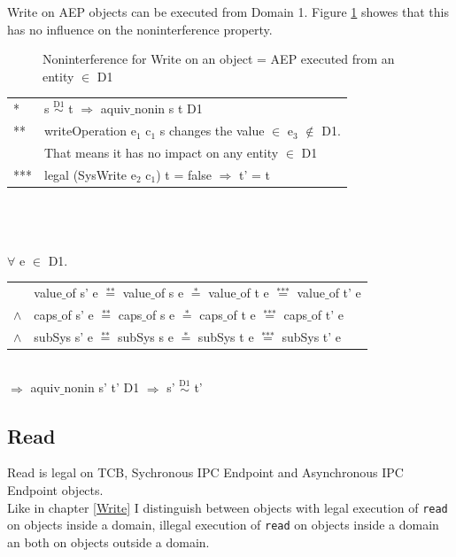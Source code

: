 \documentclass[pdftex,11pt,a4paper,twoside]{article}
\begin{document}
Write on AEP objects can be executed from Domain 1. Figure \ref{fig:WriteOut2} showes that this has no influence on the noninterference property.
\begin{flushleft}
\begin{figure}[H]
\caption{Noninterference for Write on an object = AEP executed from an entity $\in$ D1}
\label{fig:WriteOut2}
\end{figure}
\end{flushleft}
\begin{tabular}{ll}
* & s $\overset{\text{D1}}{\sim}$ t $\Rightarrow$ aquiv$\_$nonin s t D1	\\ 
** & writeOperation e$_1$ c$_1$ s changes the value $\in$ e$_3$ $\notin$ D1. \\
& That means it has no impact on any entity $\in$ D1 \\ 
*** & legal (SysWrite e$_2$ c$_1$) t = false $\Rightarrow$ t' = t
\end{tabular} \\ \\ \\
$\forall$ e $\in$ D1. \\
\begin{tabular}{ll}
& value$\_$of s' e $\overset{\text{**}}{=}$ value$\_$of s e $\overset{\text{*}}{=}$ value$\_$of t e $\overset{\text{***}}{=}$ value$\_$of t' e \\
$\wedge$ & caps$\_$of s' e $\overset{\text{**}}{=}$ caps$\_$of s e $\overset{\text{*}}{=}$ caps$\_$of t e $\overset{\text{***}}{=}$ caps$\_$of t' e \\
$\wedge$ & subSys s' e $\overset{\text{**}}{=}$ subSys s e $\overset{\text{*}}{=}$ subSys t e $\overset{\text{***}}{=}$ subSys t' e
\end{tabular} \\
$\Rightarrow$ aquiv$\_$nonin s' t' D1 $\Rightarrow$ s' $\overset{\text{D1}}{\sim}$ t'
\subsection{Read}\label{sec:Read}
Read is legal on TCB, Sychronous IPC Endpoint and Asynchronous IPC Endpoint objects. \\
Like in chapter \ref{Write} I distinguish between objects with legal execution of \texttt{read} on objects inside a domain, illegal execution of \texttt{read} on objects inside a domain an both on objects outside a domain.
\end{document}
